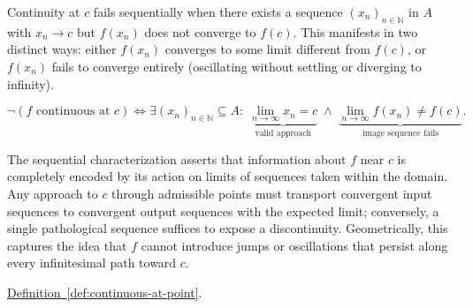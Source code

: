 \begin{remark*}
Continuity at $c$ fails sequentially when there exists a sequence $(x_n)_{n\in\mathbb{N}}$ in $A$ with $x_n \to c$ but $f(x_n)$ does not converge to $f(c)$. This manifests in two distinct ways: either $f(x_n)$ converges to some limit different from $f(c)$, or $f(x_n)$ fails to converge entirely (oscillating without settling or diverging to infinity).
\end{remark*}

\begin{remark*}
\[
\neg(\text{$f$ continuous at $c$}) \Longleftrightarrow
\exists (x_n)_{n\in\mathbb{N}} \subseteq A :\;
\underbrace{\lim_{n\to\infty} x_n = c}_{\text{valid approach}}
\;\land\;
\underbrace{\lim_{n\to\infty} f(x_n) \ne f(c)}_{\text{image sequence fails}}.
\]
\end{remark*}

\begin{remark*}[Interpretation]
The sequential characterization asserts that information about $f$ near $c$ is completely encoded by its action on limits of sequences taken within the domain. Any approach to $c$ through admissible points must transport convergent input sequences to convergent output sequences with the expected limit; conversely, a single pathological sequence suffices to expose a discontinuity. Geometrically, this captures the idea that $f$ cannot introduce jumps or oscillations that persist along every infinitesimal path toward $c$.
\end{remark*}

\begin{remark*}[Dependencies]
\hyperref[def:continuous-at-point]{Definition~\ref*{def:continuous-at-point}}.
\end{remark*}
